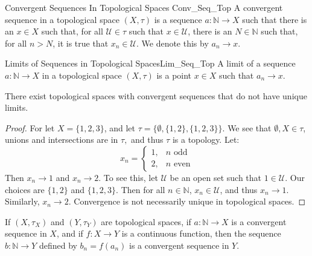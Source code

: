     \begin{ldefinition}{Convergent Sequences In Topological Spaces}
                       {Conv_Seq_Top}
        A convergent sequence in a topological space $(X,\tau)$ is a sequence
        $a:\mathbb{N}\rightarrow{X}$ such that there is an $x\in{X}$ such that,
        for all $\mathcal{U}\in\tau$ such that $x\in\mathcal{U}$, there is an
        $N\in\mathbb{N}$ such that, for all $n>N$, it is true that
        $x_{n}\in\mathcal{U}$. We denote this by $a_{n}\rightarrow{x}$.
    \end{ldefinition}
    \begin{ldefinition}{Limits of Sequences in Topological Spaces}{Lim_Seq_Top}
        A limit of a sequence $a:\mathbb{N}\rightarrow{X}$ in a topological
        space $(X,\tau)$ is a point $x\in{X}$ such that $a_{n}\rightarrow{x}$.
    \end{ldefinition}
    \begin{theorem}
        There exist topological spaces with convergent sequences that do not
        have unique limits.
    \end{theorem}
    \begin{proof}
        For let $X=\{1,2,3\}$, and let $\tau=\{\emptyset, \{1,2\},\{1,2,3\}\}$.
        We see that $\emptyset,X\in \tau$, unions and intersections are in
        $\tau,$ and thus $\tau$ is a topology. Let:
        \begin{equation}
            x_{n}=
            \begin{cases}
                1,&n\textrm{ odd}\\
                2,&n\textrm{ even}
            \end{cases}
        \end{equation}
        Then $x_n \rightarrow 1$ and $x_n \rightarrow 2$. To see this, let
        $\mathcal{U}$ be an open set such that $1\in \mathcal{U}$. Our choices
        are $\{1,2\}$ and $\{1,2,3\}$. Then for all $n\in \mathbb{N}$,
        $x_{n}\in\mathcal{U}$, and thus $x_{n}\rightarrow{1}$. Similarly,
        $x_n \rightarrow 2$. Convergence is not necessarily unique in
        topological spaces.
    \end{proof}
    \begin{theorem}
        If $(X,\tau_{X})$ and $(Y,\tau_{Y})$ are topological spaces, if
        $a:\mathbb{N}\rightarrow{X}$ is a convergent sequence in $X$, and if
        $f:X\rightarrow{Y}$ is a continuous function, then the sequence
        $b:\mathbb{N}\rightarrow{Y}$ defined by $b_{n}=f(a_{n})$ is a convergent
        sequence in $Y$.
    \end{theorem}
